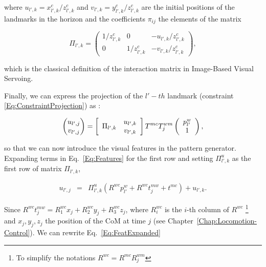 where $u_{l',k} = x^{c}_{l',k} / z^{c}_{l',k}$ and $v_{l',k} = y^{c}_{l',k} / z^{c}_{l',k}$ are the initial positions of the landmarks in the horizon and the coefficients $\pi_{ij}$ the elements of the matrix

\begin{equation*}
\Pi_{l',k} = \left(
\begin{matrix}
 1/z^{c}_{l',k} & 0 & - u_{l',k} / z^{c}_{l',k} \\
 0 & 1/z^{c}_{l',k} & - v_{l',k} / z^{c}_{l',k}
\end{matrix}
\right),
\end{equation*}

which is the classical definition of the interaction matrix in Image-Based Visual Servoing.

Finally, we can express the projection of the $l'-th$ landmark (constraint \ref{Eq:ConstraintProjection}) as :

\begin{equation}
\label{Eq:Features}
 \left(
 \begin{matrix}
  u_{l',j} \\
  v_{l',j}
 \end{matrix}
 \right) = 
\left[
\begin{array}{cc}
\multirow{2}{*}{$\Pi_{l',k}$} & u_{l',k} \\
& v_{l',k} \\
\end{array}
\right]
 T^{mc} T^{wm}_j \left( \begin{array}{c}
 p^{w}_{l'}\\
 1
 \end{array}\right),
\end{equation}

so that we can now introduce the visual features in the pattern generator. Expanding terms in Eq.~\ref{Eq:Features} for the first row and setting $\Pi^u_{l',k}$ as the first row of matrix $\Pi_{l',k}$,

\begin{eqnarray}
\label{Eq:FeatExpanded}
 u_{l',j} &= &\Pi^u_{l',k} (R^{wc} p^{w}_{l'} + R^{wc} t^{mw}_j + t^{mc}) + u_{l',k}.
\end{eqnarray}

Since $R^{wc} t^{mw}_j = R^{wc}_1 x_j + R^{wc}_2 y_j + R^{wc}_3 z_j$, where $R^{wc}_i$ is the $i$-th column of $R^{wc}$
\footnote{To simplify the notations $R^{wc}=R^{mc}R_j^{wm}$}
and $x_j,y_j,z_j$ the position of the CoM at time $j$ (see Chapter~\ref{Chap:Locomotion-Control}). We can rewrite Eq.~\ref{Eq:FeatExpanded}

